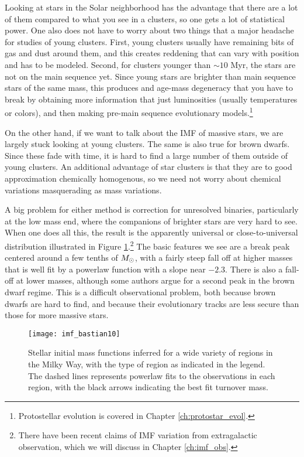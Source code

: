 Looking at stars in the Solar neighborhood has the advantage that there are a lot of them compared to what you see in a clusters, so one gets a lot of statistical power. One also does not have to worry about two things that a major headache for studies of young clusters. First, young clusters usually have remaining bits of gas and dust around them, and this creates reddening that can vary with position and has to be modeled. Second, for clusters younger than $\sim 10$ Myr, the stars are not on the main sequence yet. Since young stars are brighter than main sequence stars of the same mass, this produces and age-mass degeneracy that you have to break by obtaining more information that just luminosities (usually temperatures or colors), and then making pre-main sequence evolutionary models.\footnote{Protostellar evolution is covered in Chapter \ref{ch:protostar_evol}.}

On the other hand, if we want to talk about the IMF of massive stars, we are largely stuck looking at young clusters. The same is also true for brown dwarfs. Since these fade with time, it is hard to find a large number of them outside of young clusters. An additional advantage of star clusters is that they are to good approximation chemically homogenous, so we need not worry about chemical variations masquerading as mass variations.

A big problem for either method is correction for unresolved binaries, particularly at the low mass end, where the companions of brighter stars are very hard to see. When one does all this, the result is the apparently universal or close-to-universal distribution illustrated in Figure \ref{fig:imf_bastian10}.\footnote{There have been recent claims of IMF variation from extragalactic observation, which we will discuss in Chapter \ref{ch:imf_obs}.} The basic features we see are a break peak centered around a few tenths of $M_{\odot}$, with a fairly steep fall off at higher masses that is well fit by a powerlaw function with a slope near $-2.3$. There is also a fall-off at lower masses, although some authors argue for a second peak in the brown dwarf regime. This is a difficult observational problem, both because brown dwarfs are hard to find, and because their evolutionary tracks are less secure than those for more massive stars.

\begin{figure}
\texttt{[image: imf\_bastian10]}
\caption[Measured stellar IMFs in a variety of regions]{
\label{fig:imf_bastian10}
Stellar initial mass functions inferred for a wide variety of regions in the Milky Way, with the type of region as indicated in the legend. The dashed lines represents powerlaw fits to the observations in each region, with the black arrows indicating the best fit turnover mass.
}
\end{figure}

